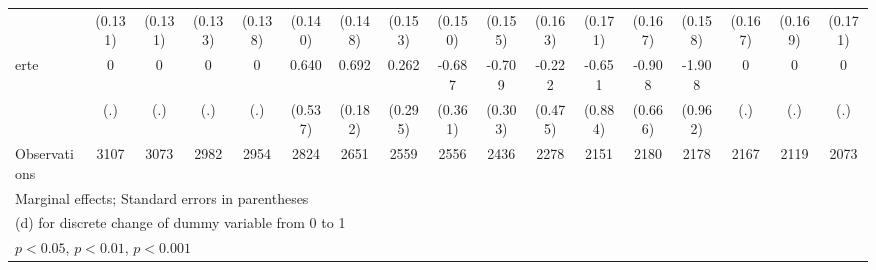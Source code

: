 {\begin{tabular}{l*{16}{c}}
                    &     (0.131)         &     (0.131)         &     (0.133)         &     (0.138)         &     (0.140)         &     (0.148)         &     (0.153)         &     (0.150)         &     (0.155)         &     (0.163)         &     (0.171)         &     (0.167)         &     (0.158)         &     (0.167)         &     (0.169)         &     (0.171)         \\
[1em]
erte                &           0         &           0         &           0         &           0         &       0.640         &       0.692\sym{***}&       0.262         &      -0.687         &      -0.709\sym{*}  &      -0.222         &      -0.651         &      -0.908         &      -1.908\sym{*}  &           0         &           0         &           0         \\
                    &         (.)         &         (.)         &         (.)         &         (.)         &     (0.537)         &     (0.182)         &     (0.295)         &     (0.361)         &     (0.303)         &     (0.475)         &     (0.884)         &     (0.666)         &     (0.962)         &         (.)         &         (.)         &         (.)         \\
\hline
Observations        &        3107         &        3073         &        2982         &        2954         &        2824         &        2651         &        2559         &        2556         &        2436         &        2278         &        2151         &        2180         &        2178         &        2167         &        2119         &        2073         \\
\hline\hline
\multicolumn{17}{l}{\footnotesize Marginal effects; Standard errors in parentheses}\\
\multicolumn{17}{l}{\footnotesize  (d) for discrete change of dummy variable from 0 to 1}\\
\multicolumn{17}{l}{\footnotesize \sym{*} \(p<0.05\), \sym{**} \(p<0.01\), \sym{***} \(p<0.001\)}\\
\end{tabular}
}
